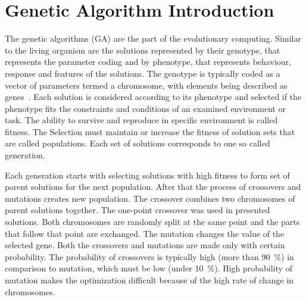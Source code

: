 \section{Genetic Algorithm Introduction}
The genetic algorithms (GA) are the part of the evolutionary computing. Similar to the living organism are the solutions represented by their genotype, that represents the parameter coding and by phenotype, that represents behaviour, response and features of the solutions. The genotype is typically coded as a vector of parameters termed a chromosome, with elements being described as genes~\cite{Fogel2006}. Each solution is considered according to its phenotype and selected if the phenotype fits the constraints and conditions of an examined environment or task. The ability to survive and reproduce in specific environment is called fitness. The Selection must maintain or increase the fitness of solution sets that are called populations. Each set of solutions corresponds to one so called generation.

Each generation starts with selecting solutions with high fitness to form set of parent solutions for the next population. After that the process of crossovers and mutations creates new population. The crossover combines two chromosomes of parent solutions together. The one-point crossover was used in presented solutions. Both chromosomes are randomly split at the same point and the parts that follow that point are exchanged. The mutation changes the value of the selected gene. Both the crossovers and mutations are made only with certain probability. The probability of crossovers is typically high (more than 90~\%) in comparison to mutation, which must be low (under 10~\%). High probability of mutation makes the optimization difficult because of the high rate of change in chromosomes.